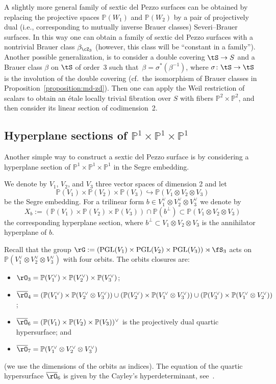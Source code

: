 \documentclass[11pt]{amsart}
\renewcommand{\P}{{\mathbb{P}}}
\DeclareMathOperator{\PGL}{\mathrm{PGL}}
\theoremstyle{plain}
\theoremstyle{definition}
\theoremstyle{remark}
\begin{document}
A slightly more general family of sextic del Pezzo surfaces can be obtained by replacing the projective spaces $\P(W_1)$ and $\P(W_2)$ 
by a pair of projectively dual (i.e., corresponding to mutually inverse Brauer classes) Severi--Brauer surfaces.
In this way one can obtain a family of sextic del Pezzo surfaces with a nontrivial Brauer class $\beta_{\cZ_3}$ 
(however, this class will be ``constant in a family'').
Another possible generalization, is to consider a double covering $\tS \to S$ and a Brauer class $\beta$ on $\tS$ of order~3 
such that~$\beta = \sigma^*(\beta^{-1})$, 
where $\sigma \colon \tS \to \tS$ is the involution of the double covering 
(cf.~the isomorphism of Brauer classes in Proposition~\ref{proposition:md-zd}).
Then one can apply the Weil restriction of scalars to obtain an \'etale locally trivial fibration over $S$ 
with fibers $\P^2 \times \P^2$, and then consider its linear section of codimension~2.

\subsection{Hyperplane sections of $\P^1 \times \P^1 \times \P^1$}
\label{subsection:p1p1p1}

Another simple way to construct a sextic del Pezzo surface is by considering a hyperplane section of $\P^1 \times \P^1 \times \P^1$ in the Segre embedding.

We denote by $V_1$, $V_2$, and $V_3$ three vector spaces of dimension 2 and let 
\begin{equation*}
\P(V_1) \times \P(V_2) \times \P(V_3) \hookrightarrow \P(V_1 \otimes V_2 \otimes V_3)
\end{equation*}
be the Segre embedding. 
For a trilinear form $b \in V_1^\vee \otimes V_2^\vee \otimes V_3^\vee$ we denote by
\begin{equation}\label{eq:xb}
X_b := (\P(V_1) \times \P(V_2) \times \P(V_3)) \cap \P(b^\perp) \subset \P(V_1 \otimes V_2 \otimes V_3) 
\end{equation}
the corresponding hyperplane section, where $b^\perp \subset V_1 \otimes V_2 \otimes V_3$ is the annihilator hyperplane of $b$.

Recall that the group $\rG := (\PGL(V_1) \times \PGL(V_2) \times \PGL(V_3)) \rtimes \fS_3$ acts on $\P(V_1^\vee \otimes V_2^\vee \otimes V_3^\vee)$ with four orbits.
The orbits closures are:
\begin{itemize}
\item $\rO_3 = \P(V_1^\vee) \times \P(V_2^\vee) \times \P(V_3^\vee)$;
\item $\overline\rO_4 = (\P(V_1^\vee) \times \P(V_2^\vee \otimes V_3^\vee)) \cup (\P(V_2^\vee) \times \P(V_1^\vee \otimes V_3^\vee)) \cup (\P(V_3^\vee) \times \P(V_1^\vee \otimes V_2^\vee))$;
\item $\overline\rO_6 = (\P(V_1) \times \P(V_2) \times \P(V_3))^\vee$ is the projectively dual quartic hypersurface; and
\item $\overline\rO_7 = \P(V_1^\vee \otimes V_2^\vee \otimes V_3^\vee)$
\end{itemize}
(we use the dimensions of the orbits as indices).
The equation of the quartic hypersurface $\overline\rO_6$ is given by the Cayley's hyperdeterminant, see~\cite[14.1.7]{gkz1994}.
\end{document}
